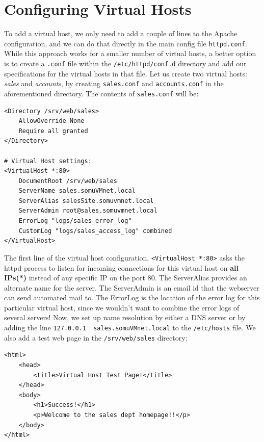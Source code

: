 \section{Configuring Virtual Hosts}
To add a virtual host, we only need to add a couple of lines to the Apache configuration, and we can do that directly in the main config file \verb|httpd.conf|. While this approach works for a smaller number of virtual hosts, a better option is to create a \verb|.conf| file within the \verb|/etc/httpd/conf.d| directory and add our specifications for the virtual hosts in that file. Let us create two virtual hosts: \textit{sales} and \textit{accounts}, by creating \verb|sales.conf| and \verb|accounts.conf| in the aforementioned directory. The contents of \verb|sales.conf| will be:

\vspace{-15pt}
\begin{verbatim}
<Directory /srv/web/sales>
	AllowOverride None
	Require all granted	
</Directory>

# Virtual Host settings:
<VirtualHost *:80>
	DocumentRoot /srv/web/sales						
	ServerName sales.somuVMnet.local
	ServerAlias salesSite.somuvmnet.local
	ServerAdmin root@sales.somuvmnet.local			
	ErrorLog "logs/sales_error_log"
	CustomLog "logs/sales_access_log" combined
</VirtualHost>
\end{verbatim}
\vspace{-10pt}	

\noindent
The first line of the virtual host configuration, \verb|<VirtualHost *:80>| asks the httpd process to listen for incoming connections for this virtual host on \textbf{all IPs(*)} instead of any specific IP on the port 80. The ServerAlias provides an alternate name for the server. The ServerAdmin is an email id that the webserver can send automated mail to. The ErrorLog is the location of the error log for this particular virtual host, since we wouldn't want to combine the error logs of several servers! Now, we set up name resolution by either a DNS server or by adding the line \verb|127.0.0.1  sales.somuVMnet.local| to the \verb|/etc/hosts| file. We also add a test web page in the \verb|/srv/web/sales| directory:

\vspace{-15pt}
\begin{verbatim}
<html>
	<head>
		<title>Virtual Host Test Page!</title>
	</head>
	<body>
		<h1>Success!</h1>
		<p>Welcome to the sales dept homepage!!</p>
	</body>
</html>
\end{verbatim}
\vspace{-10pt}	

